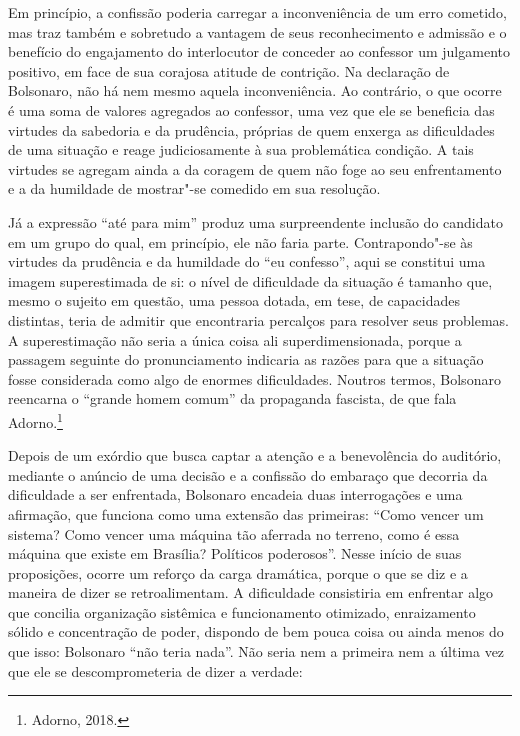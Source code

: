Em princípio, a confissão poderia carregar a inconveniência de um erro
cometido, mas traz também e sobretudo a vantagem de seus reconhecimento
e admissão e o benefício do engajamento do interlocutor de conceder ao
confessor um julgamento positivo, em face de sua corajosa atitude de
contrição. Na declaração de Bolsonaro, não há nem mesmo aquela
inconveniência. Ao contrário, o que ocorre é uma soma de valores
agregados ao confessor, uma vez que ele se beneficia das virtudes da
sabedoria e da prudência, próprias de quem enxerga as dificuldades de
uma situação e reage judiciosamente à sua problemática condição. A tais
virtudes se agregam ainda a da coragem de quem não foge ao seu
enfrentamento e a da humildade de mostrar"-se comedido em sua resolução.

Já a expressão ``até para mim'' produz uma surpreendente inclusão do
candidato em um grupo do qual, em princípio, ele não faria parte.
Contrapondo"-se às virtudes da prudência e da humildade do ``eu
confesso'', aqui se constitui uma imagem superestimada de si: o nível de
dificuldade da situação é tamanho que, mesmo o sujeito em questão, uma
pessoa dotada, em tese, de capacidades distintas, teria de admitir que
encontraria percalços para resolver seus problemas. A superestimação não
seria a única coisa ali superdimensionada, porque a passagem seguinte do
pronunciamento indicaria as razões para que a situação fosse considerada
como algo de enormes dificuldades. Noutros termos, Bolsonaro reencarna o
``grande homem comum'' da propaganda fascista, de que fala
Adorno.\footnote{Adorno, 2018.}

Depois de um exórdio que busca captar a atenção e a benevolência do
auditório, mediante o anúncio de uma decisão e a confissão do embaraço
que decorria da dificuldade a ser enfrentada, Bolsonaro encadeia duas
interrogações e uma afirmação, que funciona como uma extensão das
primeiras: ``Como vencer um sistema? Como vencer uma máquina tão
aferrada no terreno, como é essa máquina que existe em Brasília?
Políticos poderosos''. Nesse início de suas proposições, ocorre um
reforço da carga dramática, porque o que se diz e a maneira de dizer se
retroalimentam. A dificuldade consistiria em enfrentar algo que concilia
organização sistêmica e funcionamento otimizado, enraizamento sólido e
concentração de poder, dispondo de bem pouca coisa ou ainda menos do que
isso: Bolsonaro ``não teria nada''. Não seria nem a primeira nem a
última vez que ele se descomprometeria de dizer a verdade:

